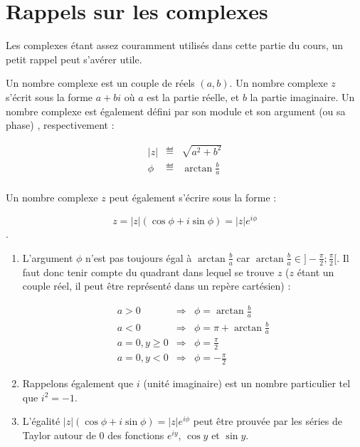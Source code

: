 \section{Rappels sur les complexes}
Les complexes étant assez couramment utilisés dans cette partie du cours, un petit rappel
peut s'avérer utile.

\begin{mydef}
	Un nombre complexe est un couple de réels $(a, b)$. Un nombre complexe $z$ s'écrit
	sous la forme $a+bi$ où $a$ est la partie réelle, et $b$ la partie imaginaire.
	Un nombre complexe est également défini par son module et son argument (ou sa phase)
	, respectivement :

	\begin{eqnarray*}
		|z| & \eqdef & \sqrt{a^2 + b^2}\\
		\phi & \eqdef & \arctan \frac{b}{a}\\
	\end{eqnarray*}

	Un nombre complexe $z$ peut également s'écrire sous la forme :

	$$z = |z|(\cos \phi + i \sin \phi) = |z|e^{i \phi}$$.
\end{mydef}

\begin{myrem}
	\begin{enumerate}
		\item L'argument $\phi$ n'est pas toujours égal à $\arctan \frac{b}{a}$ car
		$\arctan \frac{b}{a} \in ]-\frac{\pi}{2} ; \frac{\pi}{2}[$. Il faut donc tenir
		compte du quadrant dans lequel se trouve $z$ ($z$ étant un couple réel, il peut être
		représenté dans un repère cartésien) :

		\begin{eqnarray*}
			a > 0 & \Rightarrow & \phi = \arctan \frac{b}{a} \\
			a < 0 & \Rightarrow & \phi = \pi + \arctan \frac{b}{a}\\
			a = 0, y \ge 0 & \Rightarrow & \phi = \frac{\pi}{2}\\
			a = 0, y < 0 & \Rightarrow & \phi = -\frac{\pi}{2}
		\end{eqnarray*}

		\item Rappelons également que $i$ (unité imaginaire) est un nombre particulier
		tel que $i^2 = -1$.
		\item L'égalité $|z|(\cos \phi + i \sin \phi) = |z|e^{i \phi}$ peut être prouvée par
		les séries de Taylor autour de 0 des fonctions $e^{iy}$, $\cos y$ et $\sin y$.
	\end{enumerate}
\end{myrem}

